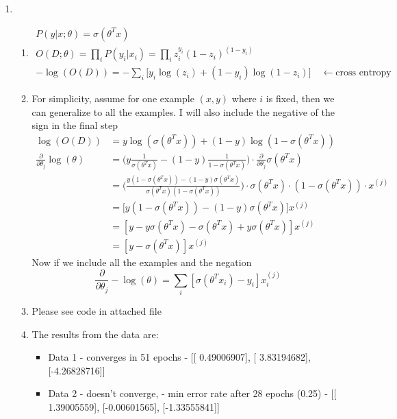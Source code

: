\documentclass[a4paper]{article}
\begin{document}
\begin{enumerate}
	\item 
	\begin{enumerate}
	\item 
	\begin{gather*}
		P(y|x;\theta) = \sigma(\theta^T x)\\
		O(D; \theta) = \prod_i P(y_i|x_i) = \prod_i z_i^{y_i} (1-z_i)^{(1-y_i)} \tag{$z_i = \sigma(\theta^T x)$}\\
		\boxed{-\log (O(D)) = -\sum_i \big[y_i \log (z_i) + (1-y_i)\log (1-z_i) \big]} \quad \leftarrow \text{cross entropy}
	\end{gather*}
	\item For simplicity, assume for one example $(x,y)$ where $i$ is fixed, then we can generalize to all the examples. I will also include the negative of the sign in the final step
	\begin{align*}
		\log (O(D)) & =  y \log (\sigma(\theta^T x)) + (1-y)\log (1-\sigma(\theta^T x)) \\
		\frac{\partial}{\partial \theta_j} \log (\theta) & = \bigg(y \frac{1}{\sigma(\theta^T x)} - (1-y) \frac{1}{1-\sigma(\theta^T x)} \bigg) \cdot \frac{\partial}{\partial \theta_j} \sigma(\theta^T x)\\
		& = \bigg(\frac{y (1-\sigma(\theta^T x)) -(1-y)\sigma(\theta^T x)}{\sigma(\theta^T x) (1-\sigma(\theta^T x))} \bigg) \cdot  \sigma(\theta^T x) \cdot (1-\sigma(\theta^T x)) \cdot x^{(j)}\\
		& = \big[ y (1-\sigma(\theta^T x)) -(1-y)\sigma(\theta^T x) \big] x^{(j)}\\
		& = [y - y\sigma(\theta^T x) - \sigma(\theta^T x) + y\sigma(\theta^T x)] x^{(j)}\\
		& = [y - \sigma(\theta^T x)] x^{(j)}
	\end{align*}
	Now if we include all the examples and the negation
	\begin{equation*}
		\boxed{\frac{\partial}{\partial \theta_j} -\log (\theta) = \sum_i [\sigma(\theta^T x_i) - y_i] x_i^{(j)}}
	\end{equation*}
	\item Please see code in attached file
	\item The results from the data are:
	\begin{itemize}
		\item Data 1 - converges in 51 epochs - [[ 0.49006907], [ 3.83194682], [-4.26828716]]
		\item Data 2 - doesn't converge, - min error rate after 28 epochs (0.25) - [[ 1.39005559], [-0.00601565], [-1.33555841]]

\end{itemize}
\end{enumerate}
\end{enumerate}
\end{document}
